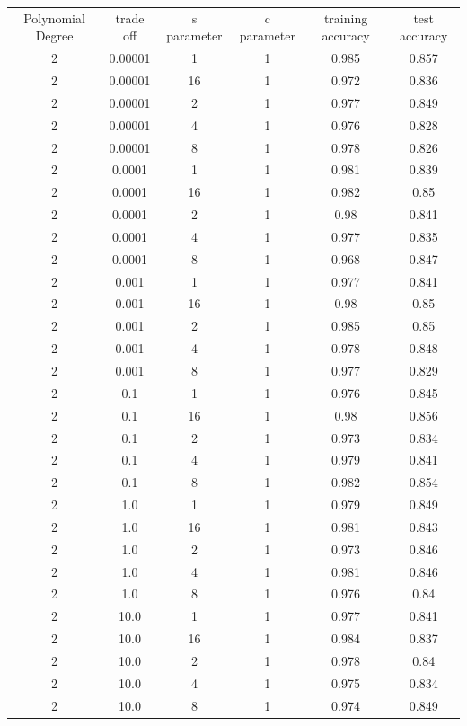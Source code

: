 \documentclass[a4paper,10pt,titlepage]{article}
\begin{document}
\begin{tabular}{c c c c c c} 
\hline\hline 
Polynomial Degree & trade off  & s parameter & c parameter & training accuracy & test accuracy \\
2 & 0.00001 & 1 & 1 & 0.985 & 0.857 \\
2 & 0.00001 & 16 & 1 & 0.972 & 0.836 \\
2 & 0.00001 & 2 & 1 & 0.977 & 0.849 \\
2 & 0.00001 & 4 & 1 & 0.976 & 0.828 \\
2 & 0.00001 & 8 & 1 & 0.978 & 0.826 \\
2 & 0.0001 & 1 & 1 & 0.981 & 0.839 \\
2 & 0.0001 & 16 & 1 & 0.982 & 0.85 \\
2 & 0.0001 & 2 & 1 & 0.98  &0.841 \\
2 & 0.0001 & 4 & 1 & 0.977 & 0.835 \\
2 & 0.0001 & 8 & 1 & 0.968 & 0.847 \\
2 & 0.001 & 1 & 1 & 0.977 & 0.841 \\
2 & 0.001 & 16 & 1 & 0.98 & 0.85 \\
2 & 0.001 & 2 & 1 & 0.985 & 0.85 \\
2 & 0.001 & 4 & 1 & 0.978 & 0.848 \\
2 & 0.001 & 8 & 1 & 0.977 & 0.829 \\
2 & 0.1 & 1 & 1 & 0.976 & 0.845 \\
2 & 0.1 & 16 & 1 & 0.98 & 0.856 \\
2 & 0.1 & 2 & 1 & 0.973 & 0.834 \\
2 & 0.1 & 4 & 1 & 0.979 & 0.841 \\
2 & 0.1 & 8 & 1 & 0.982 & 0.854 \\
2 & 1.0 & 1 & 1 & 0.979 & 0.849 \\
2 & 1.0 & 16 & 1 & 0.981 & 0.843 \\
2 & 1.0 & 2 & 1 & 0.973 & 0.846 \\
2 & 1.0 & 4 & 1 & 0.981 & 0.846 \\
2 & 1.0 & 8 & 1 & 0.976 & 0.84 \\
2 & 10.0 & 1 & 1 & 0.977 & 0.841 \\
2 & 10.0 & 16 & 1 & 0.984 & 0.837 \\
2 & 10.0 & 2 & 1 & 0.978 & 0.84 \\
2 & 10.0 & 4 & 1 & 0.975 & 0.834 \\
2 & 10.0 & 8 & 1 & 0.974 & 0.849 \\
\hline 
\end{tabular} 
\label{tab:dist_result}
\end{document}

